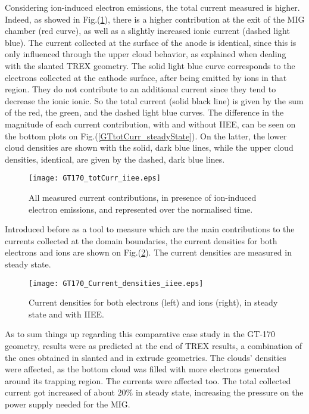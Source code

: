 \noindent Considering ion-induced electron emissions, the total current measured is higher. Indeed, as showed in Fig.(\ref{GTtotCurr_iiee}), there is a higher contribution at the exit of the MIG chamber (red curve), as well as a slightly increased ionic current (dashed light blue). The current collected at the surface of the anode is identical, since this is only influenced through the upper cloud behavior, as explained when dealing with the slanted TREX geometry. The solid light blue curve corresponds to the electrons collected at the cathode surface, after being emitted by ions in that region. They do not contribute to an additional current since they tend to decrease the ionic ionic. So the total current (solid black line) is given by the sum of the red, the green, and the dashed light blue curves. The difference in the magnitude of each current contribution, with and without IIEE, can be seen on the bottom plots on Fig.(\ref{GTtotCurr_steadyState}). On the latter, the lower cloud densities are shown with the solid, dark blue lines, while the upper cloud densities, identical, are given by the dashed, dark blue lines.\\

 
\begin{figure}[h!]
\centering
	\texttt{[image: GT170\_totCurr\_iiee.eps]}
	\caption{\label{GTtotCurr_iiee} All measured current contributions, in presence of ion-induced electron emissions, and represented over the normalised time.}
\end{figure}

\noindent Introduced before as a tool to measure which are the main contributions to the currents collected at the domain boundaries, the current densities for both electrons and ions are shown on Fig.(\ref{GT170_CurrDens}). The current densities are measured in steady state.  

\begin{figure}[h!]
\centering
	\texttt{[image: GT170\_Current\_densities\_iiee.eps]}
	\caption{\label{GT170_CurrDens} Current densities for both electrons (left) and ions (right), in steady state and with IIEE.}
\end{figure}

As to sum things up regarding this comparative case study in the GT-170 geometry, results were as predicted at the end of TREX results, a combination of the ones obtained in slanted and in extrude geometries. The clouds' densities were affected, as the bottom cloud was filled with more electrons generated around its trapping region. The currents were affected too. The total collected current got increased of about $20\%$ in steady state, increasing the pressure on the power supply needed for the MIG.\\

